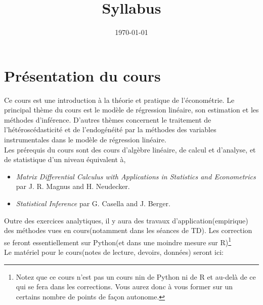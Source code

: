 
\title{Syllabus}
\date{\today}

\maketitle
\section*{ Présentation du cours}
Ce cours est une introduction  à la théorie et pratique de l'économétrie. Le principal thème du cours est le modèle de régression linéaire, son estimation et les méthodes d'inférence. D'autres thèmes concernent le traitement de l'hétéroscédasticité et de l'endogénéité par la méthodes des variables instrumentales dans le modèle de régression linéaire.\\
Les prérequis du cours sont  des cours d'algèbre linéaire, de calcul et d'analyse, et de statistique d'un niveau équivalent à,
\begin{itemize}
\item \emph{Matrix Differential Calculus with Applications in Statistics and Econometrics} par J. R. Magnus and H. Neudecker.
\item \emph{Statistical Inference} par  G. Casella and J. Berger.
\end{itemize}
Outre des exercices analytiques, il y aura des travaux d'application(empirique) des méthodes vues en cours(notamment dans les séances de TD). Les correction se feront essentiellement sur Python(et dans une moindre mesure sur R)\footnote{Notez que ce cours n'est pas un cours nin de Python ni de R et au-delà de ce qui se fera dans les corrections. Vous aurez donc à vous former sur un certains nombre de points de façon autonome.}\\
Le matériel pour le cours(notes de lecture, devoirs, données) seront ici:


